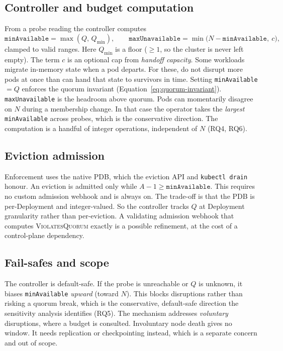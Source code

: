 \documentclass[AMA,Times1COL]{WileyNJDv5}
\begin{document}
\subsection{Controller and budget computation}\label{sec:design-coord}
From a probe reading the controller computes
\begin{equation}\label{eq:budget}
  \texttt{minAvailable} = \max(Q,\,Q_{\min}), \qquad
  \texttt{maxUnavailable} = \min\!\big(N-\texttt{minAvailable},\ c\big),
\end{equation}
clamped to valid ranges. Here $Q_{\min}$ is a floor ($\ge1$, so the cluster is never left empty). The
term $c$ is an optional cap from \emph{handoff capacity}. Some workloads migrate in-memory state when a
pod departs. For these, do not disrupt more pods at once than can hand that state to survivors in time.
Setting \texttt{minAvailable}${}=Q$ enforces the quorum invariant
(Equation~\eqref{eq:quorum-invariant}). \texttt{maxUnavailable} is the headroom above quorum. Pods can
momentarily disagree on $N$ during a membership change. In that case the operator takes the
\emph{largest} \texttt{minAvailable} across probes, which is the conservative direction. The computation
is a handful of integer operations, independent of $N$ (RQ4, RQ6).

\subsection{Eviction admission}\label{sec:design-admit}
Enforcement uses the native PDB, which the eviction API and \texttt{kubectl drain} honour. An eviction is
admitted only while $A-1\ge\texttt{minAvailable}$. This requires no custom admission webhook and is
always on. The trade-off is that the PDB is per-Deployment and integer-valued. So the controller tracks
$Q$ at Deployment granularity rather than per-eviction. A validating admission webhook that computes
\textsc{ViolatesQuorum} exactly is a possible refinement, at the cost of a control-plane dependency.

\subsection{Fail-safes and scope}\label{sec:design-failsafe}
The controller is default-safe. If the probe is unreachable or $Q$ is unknown, it biases
\texttt{minAvailable} \emph{upward} (toward $N$). This blocks disruptions rather than risking a quorum
break, which is the conservative, default-safe direction the sensitivity analysis identifies (RQ5). The
mechanism addresses \emph{voluntary} disruptions, where a budget is consulted. Involuntary node death
gives no window. It needs replication or checkpointing instead, which is a separate concern and out of
scope.
\end{document}
